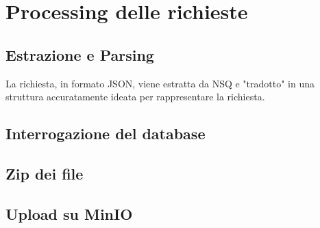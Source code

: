\section{Processing delle richieste}

\subsection{Estrazione e Parsing}

La richiesta, in formato JSON, viene estratta da NSQ e "tradotto" in una struttura accuratamente ideata per rappresentare la richiesta.

\subsection{Interrogazione del database}

\subsection{Zip dei file}

\subsection{Upload su MinIO}